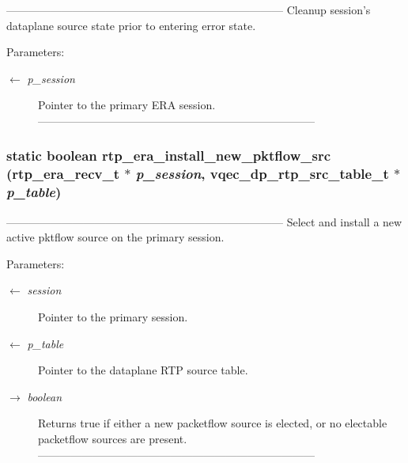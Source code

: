 --------------------------------------------------------------------------- Cleanup session's dataplane source state prior to entering error state.

\begin{Desc}
\item[Parameters:]
\begin{description}
\item[\mbox{$\leftarrow$} {\em p\_\-session}]Pointer to the primary ERA session. --------------------------------------------------------------------------- \end{description}
\end{Desc}
\subsubsection{\setlength{\rightskip}{0pt plus 5cm}static boolean rtp\_\-era\_\-install\_\-new\_\-pktflow\_\-src (\bf{rtp\_\-era\_\-recv\_\-t} $\ast$ {\em p\_\-session}, vqec\_\-dp\_\-rtp\_\-src\_\-table\_\-t $\ast$ {\em p\_\-table})\hspace{0.3cm}{\tt  [static]}}\label{rtp__era__recv_8c_086d7b44e590e74ab342543d8ef69b92}


--------------------------------------------------------------------------- Select and install a new active pktflow source on the primary session.

\begin{Desc}
\item[Parameters:]
\begin{description}
\item[\mbox{$\leftarrow$} {\em session}]Pointer to the primary session. \item[\mbox{$\leftarrow$} {\em p\_\-table}]Pointer to the dataplane RTP source table. \item[\mbox{$\rightarrow$} {\em boolean}]Returns true if either a new packetflow source is elected, or no electable packetflow sources are present. --------------------------------------------------------------------------- \end{description}
\end{Desc}
